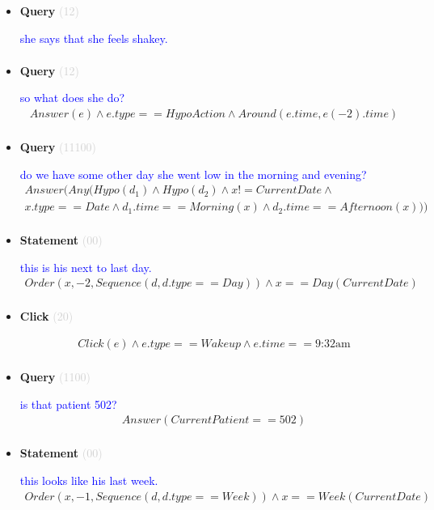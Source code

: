 \documentclass[11pt]{article}
\newcommand{\key}[1]{\textcolor{lightgray}{#1}}
\newcounter{CQuery}
\newcounter{CStatement}
\newcounter{CClick}
\begin{document}
\begin{itemize}
\item
\textbf{Query\theCQuery} \key{(12)} \addtocounter{CQuery}{1}
\textcolor{blue}{ she says that she feels shakey. }
\begin{multline*}
\end{multline*}


\item
\textbf{Query\theCQuery} \key{(12)} \addtocounter{CQuery}{1}
\textcolor{blue}{ so what does she do? }
\begin{multline*}
Answer(e) \wedge e.type == HypoAction \wedge Around(e.time, e(-2).time) \\ 
\end{multline*}


\item
\textbf{Query\theCQuery} \key{(11100)} \addtocounter{CQuery}{1}
\textcolor{blue}{ do we have some other day she went low in the morning and evening? }
\begin{multline*}
Answer(Any(Hypo(d_1) \wedge Hypo(d_2) \wedge x != CurrentDate \wedge \\ 
x.type==Date \wedge d_1.time==Morning(x) \wedge d_2.time==Afternoon(x))) \\ 
\end{multline*}


\item
\textbf{Statement\theCStatement} \key{(00)} \addtocounter{CStatement}{1}
\textcolor{blue}{ this is his next to last day. }
\begin{multline*}
Order(x, -2, Sequence(d, d.type==Day)) \wedge x==Day(CurrentDate) \\ 
\end{multline*}


\item
\textbf{Click\theCClick} \key{(20)} \addtocounter{CClick}{1}
\textcolor{blue}{  }
\begin{multline*}
Click(e) \wedge e.type==Wakeup \wedge e.time==\mbox{9:32am} \\ 
\end{multline*}


\item
\textbf{Query\theCQuery} \key{(1100)} \addtocounter{CQuery}{1}
\textcolor{blue}{ is that patient 502? }
\begin{multline*}
Answer(CurrentPatient==502) \\ 
\end{multline*}


\item
\textbf{Statement\theCStatement} \key{(00)} \addtocounter{CStatement}{1}
\textcolor{blue}{ this looks like his last week. }
\begin{multline*}
Order(x, -1, Sequence(d, d.type==Week)) \wedge x==Week(CurrentDate) \\ 
\end{multline*}



\end{itemize}
\end{document}
